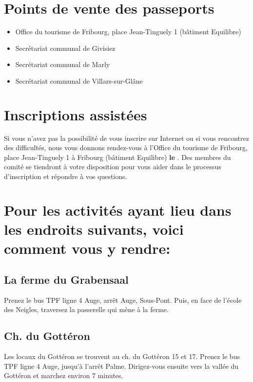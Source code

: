 \section*{Points de vente des passeports}

\begin{itemize}
\item Office du tourisme de Fribourg, place Jean-Tinguely 1 (bâtiment Equilibre)
\item Secrétariat communal de Givisiez
\item Secrétariat communal de Marly
\item Secrétariat communal de Villars-sur-Glâne

\end{itemize}

\newpage
\section*{Inscriptions assistées}

Si vous n'avez pas la possibilité de vous inscrire sur Internet ou si vous rencontrez des difficultés, nous vous donnons
rendez-vous à l'Office du tourisme de Fribourg, place Jean-Tinguely 1 à Fribourg (bâtiment Equilibre)
\textbf{le }. Des membres du comité se tiendront à votre disposition pour vous aider dans
le processus d'inscription et répondre à vos questions.

\section*{Pour les activités ayant lieu dans les endroits suivants, voici comment vous y rendre:}

\subsection*{La ferme du Grabensaal}

Prenez le bus TPF ligne 4 Auge, arrêt \og{}Auge, Sous-Pont\fg{}. Puis, en face de l'école des Neigles, traversez la passerelle
qui mène à la ferme.

\subsection*{Ch. du Gottéron}

Les locaux du Gottéron se trouvent au ch. du Gottéron 15 et 17. Prenez le bus TPF ligne 4 Auge, jusqu'à l'arrêt
\og{}Palme\fg{}. Dirigez-vous ensuite vers la vallée du Gottéron et marchez environ 7 minutes.

